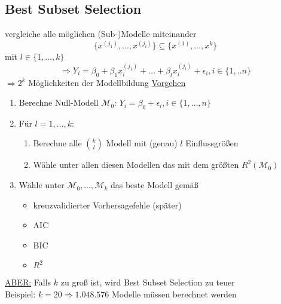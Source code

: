 \subsection{Best Subset Selection}
vergleiche alle möglichen (Sub-)Modelle miteinander
\[ \{ x^{(j_1)},\dots, x^{(j_l)}\} \subseteq \{x^{(1)}, \dots, x^{k} \} \]
mit 
$l \in \{1, \dots, k \} $
\[ \Rightarrow Y_i = \beta_0 + \beta_1 x_i^{(j_1)} + \dots + \beta_l x_i^{(j_l)} + \epsilon_i , i \in \{1,..n\} \]
$\Rightarrow 2^{k} $ Möglichkeiten der Modellbildung
\underline{Vorgehen}
\begin{enumerate}
	\item Berechne Null-Modell $\mathcal{M}_0 $:
		$Y_i= \beta_0 + \epsilon_i , i \in \{1,\dots,n\} $
	\item Für $l=1,\dots,k$:
		\begin{enumerate}
			\item Berechne alle $\binom{k}{l}$ Modell mit (genau) $l$ Einflussgrößen
			\item Wähle unter allen diesen Modellen das mit dem größten $R^{2} (\mathcal{M}_0)$
		\end{enumerate}
	\item Wähle unter $\mathcal{M}_0,\dots,\mathcal{M}_k$ das beste Modell gemäß
		\begin{itemize}
			\item kreuzvalidierter Vorhersagefehle (später)
			\item AIC
			\item BIC
			\item $R^2$
		\end{itemize}
\end{enumerate}
\underline{ABER:} Falls $k$ zu groß ist, wird Best Subset Selection zu teuer \\
Beispiel: $k=20 \Rightarrow 1.048.576$ Modelle müssen berechnet werden


